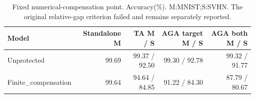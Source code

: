 \begin{table}[t]\centering
\caption{Fixed numerical-compensation point. Accuracy(\%). M:MNIST;S:SVHN. The original relative-gap criterion failed and remains separately reported.}\label{tab:numerical-followup}
\begin{tabular}{lrrrr}\toprule
Model & Standalone M & TA M / S & AGA target M / S & AGA both M / S \\
\midrule
Unprotected & 99.69 & 99.37 / 92.50 & 99.30 / 92.78 & 99.32 / 91.77 \\
Finite\_compensation & 99.64 & 94.64 / 84.85 & 91.22 / 84.30 & 87.79 / 80.67 \\
\bottomrule\end{tabular}
\end{table}
